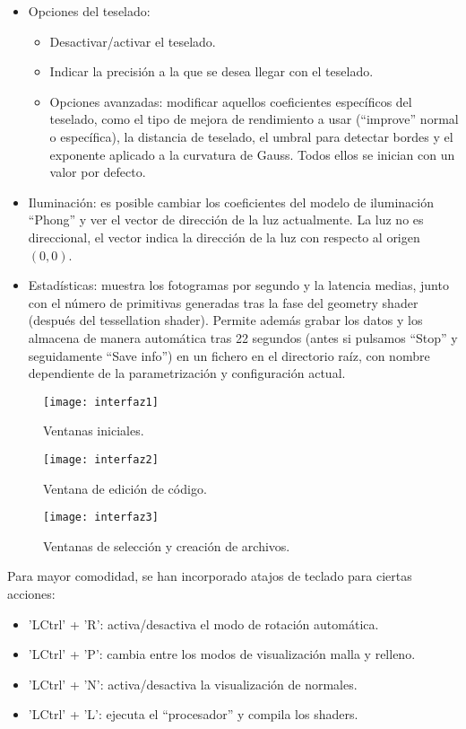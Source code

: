 \begin{itemize}
\begin{itemize}
	\end{itemize}
	\item Opciones del teselado:
	\begin{itemize}
		\item Desactivar/activar el teselado.
		\item Indicar la precisión a la que se desea llegar con el teselado.
		\item Opciones avanzadas: modificar aquellos coeficientes específicos del teselado, como el tipo de mejora de rendimiento a usar (``improve'' normal o específica), la distancia de teselado, el umbral para detectar bordes y el exponente aplicado a la curvatura de Gauss. Todos ellos se inician con un valor por defecto.
	\end{itemize}
	\item Iluminación: es posible cambiar los coeficientes del modelo de iluminación ``Phong'' y ver el vector de dirección de la luz actualmente. La luz no es direccional, el vector indica la dirección de la luz con respecto al origen $(0,0)$.
	\item Estadísticas: muestra los fotogramas por segundo y la latencia medias, junto con el número de primitivas generadas tras la fase del geometry shader (después del tessellation shader). Permite además grabar los datos y los almacena de manera automática tras 22 segundos (antes si pulsamos ``Stop'' y seguidamente ``Save info'') en un fichero en el directorio raíz, con nombre dependiente de la parametrización y configuración actual.
\end{itemize}

\begin{figure}[h]
  	\centering
  	\texttt{[image: interfaz1]}
  	\caption{Ventanas iniciales.}
  	\label{fig:interfaz1}
\end{figure}
\newpage
\begin{figure}[h]
  	\centering
  	\texttt{[image: interfaz2]}
  	\caption{Ventana de edición de código.}
  	\texttt{[image: interfaz3]}
  	\caption{Ventanas de selección y creación de archivos.}
  	\label{fig:interfaz23}
\end{figure}
\newpage
Para mayor comodidad, se han incorporado atajos de teclado para ciertas acciones:
\begin{itemize}
	\item 'LCtrl' + 'R': activa/desactiva el modo de rotación automática.
	\item 'LCtrl' + 'P': cambia entre los modos de visualización malla y relleno.
	\item 'LCtrl' + 'N': activa/desactiva la visualización de normales.
	\item 'LCtrl' + 'L': ejecuta el ``procesador'' y compila los shaders.
\end{itemize}

